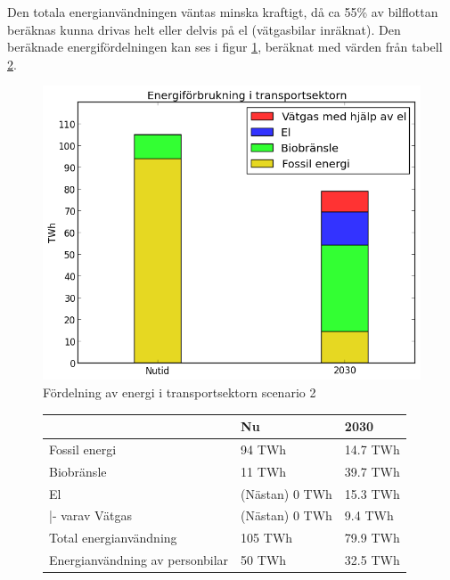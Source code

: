 \documentclass[a4paper,11pt,fleqn, titlepage]{article}
\begin{document}
Den totala energianvändningen väntas minska kraftigt, då ca 55\% av bilflottan beräknas
kunna drivas helt eller delvis på el (vätgasbilar inräknat). Den beräknade energifördelningen
kan ses i figur \ref{fig:scen2transport}, beräknat med värden från tabell \ref{tab:scen2energi}.

\begin{figure}[h!]
       \centering
       \includegraphics[scale=0.7]{scen2transport.png}
       \caption{Fördelning av energi i transportsektorn scenario 2}
       \label{fig:scen2transport}
\end{figure}

\begin{figure}[h!]
	\centering
	\label{tab:scen2energi}
	\begin{tabular}{ | l | l | l | }
	\hline
						& Nu		& 2030 \\ \hline
	Fossil energi				& 94 TWh	& 14.7 TWh \\ \hline
	Biobränsle				& 11 TWh	& 39.7 TWh \\ \hline %
	El					& (Nästan) 0 TWh &  15.3 TWh \\ \hline %
	|- varav Vätgas     & (Nästan) 0 TWh & 9.4 TWh\\ \hline
	Total energianvändning		& 105 TWh	& 79.9 TWh \\ \hline
	Energianvändning av personbilar	& 50 TWh	& 32.5 TWh \\ \hline
	\end{tabular}
\end{figure}
\end{document}
